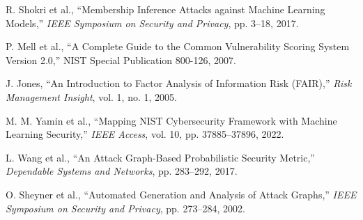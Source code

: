 \documentclass[11pt,letterpaper]{article}
\begin{document}
\begin{thebibliography}{99}
R. Shokri et al., ``Membership Inference Attacks against Machine Learning Models,'' \emph{IEEE Symposium on Security and Privacy}, pp. 3--18, 2017.

P. Mell et al., ``A Complete Guide to the Common Vulnerability Scoring System Version 2.0,'' NIST Special Publication 800-126, 2007.

J. Jones, ``An Introduction to Factor Analysis of Information Risk (FAIR),'' \emph{Risk Management Insight}, vol. 1, no. 1, 2005.

M. M. Yamin et al., ``Mapping NIST Cybersecurity Framework with Machine Learning Security,'' \emph{IEEE Access}, vol. 10, pp. 37885--37896, 2022.

L. Wang et al., ``An Attack Graph-Based Probabilistic Security Metric,'' \emph{Dependable Systems and Networks}, pp. 283--292, 2017.

O. Sheyner et al., ``Automated Generation and Analysis of Attack Graphs,'' \emph{IEEE Symposium on Security and Privacy}, pp. 273--284, 2002.

\end{thebibliography}
\end{document}
